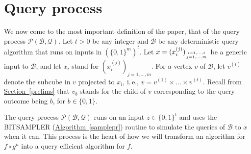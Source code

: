 \documentclass[11pt]{article}
\numberwithin{equation}{section}
\theoremstyle{definition}
\theoremstyle{plain}
\newcommand{\ie}{i.\,e.}
\newcommand{\expref}[2]{\hyperref[#2]{#1~\ref{#2}}}
\newcommand{\clB}{\mathcal{B}}
\newcommand{\clQ}{\mathcal{Q}}
\newcommand{\clP}{\mathcal{P}}
\begin{document}
\section{Query process}
\label{cc}
We now come to the most important definition of the paper, that of the query process $\clP(\clB, \clQ)$.
Let $t>0$ be any integer and $\clB$ be any deterministic query algorithm that runs on inputs in $\left(\{0,1\}^m\right)^t$. Let $x=(x_i^{(j)})_{{i=1, \ldots, t} \atop {j=1, \ldots, m}}$ be a generic input to $\clB$, and let $x_i$ stand for $(x_i^{(j)})_{j=1, \ldots, m}$. 
For a vertex $v$ of $\clB$, let $v^{(i)}$ denote the subcube in $v$ projected to $x_i$, \ie, $v=v^{(1)} \times \ldots \times v^{(t)}$. Recall from \expref{Section}{prelims} that $v_b$ stands for the child of $v$ corresponding to the query 
outcome being $b$, for $b \in \{0,1\}$.  

The query process $\clP(\clB, \clQ)$ runs on an input $z \in \{0,1\}^t$ and uses the BITSAMPLER (\expref{Algorithm}{samplepr}) routine to simulate the queries of $\clB$ to $x$ when it can.  This process is the heart of how we will transform an 
algorithm for $f \circ g^n$ into a query efficient algorithm for $f$. 
\end{document}

